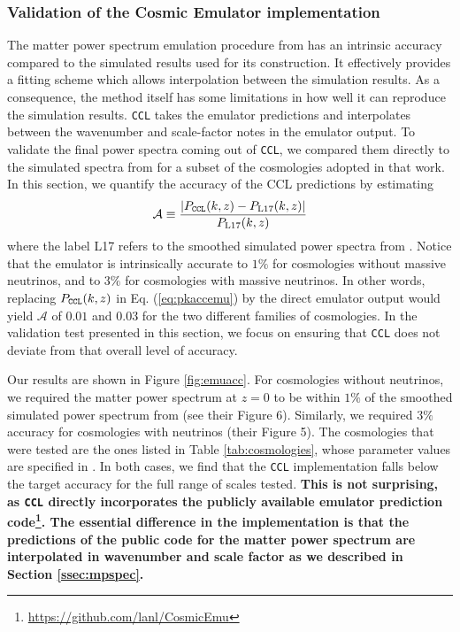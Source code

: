 \documentclass[\docopts]{\docclass}
\newcommand{\ccl}{{\tt CCL}\xspace}
\begin{document}
\subsubsection{Validation of the Cosmic Emulator implementation}
\label{ss:cosmicemu}

The matter power spectrum emulation procedure from \citet{Lawrence17} has an intrinsic accuracy compared to the simulated results used for its construction. It effectively provides a fitting scheme which allows interpolation between the simulation results. As a consequence, the method itself has some limitations in how well it can reproduce the simulation results. \ccl takes the emulator predictions and interpolates between the wavenumber and scale-factor notes in the emulator output. To validate the final power spectra coming out of \ccl, we compared them directly to the simulated spectra from \citet{Lawrence17} for a subset of the cosmologies adopted in that work. In this section, we quantify the accuracy of the CCL predictions by estimating
\begin{equation}
  \mathcal{A}\equiv\frac{|P_{\tt CCL}(k,z)-P_{\rm L17}(k,z)|}{P_{\rm L17}(k,z)}
  \label{eq:pkaccemu}
\end{equation}
where the label L17 refers to the smoothed simulated power spectra from \citet{Lawrence17}. Notice that the emulator is intrinsically accurate to $1\%$ for cosmologies without massive neutrinos, and to $3\%$ for cosmologies with massive neutrinos. In other words, replacing $P_{\tt CCL}(k,z)$ in Eq. (\ref{eq:pkaccemu}) by the direct emulator output would yield $\mathcal{A}$ of $0.01$ and $0.03$ for the two different families of cosmologies. In the validation test presented in this section, we focus on ensuring that \ccl does not deviate from that overall level of accuracy.

Our results are shown in Figure \ref{fig:emuacc}. For cosmologies without neutrinos, we required the matter power spectrum at $z=0$ to be within $1\%$ of the smoothed simulated power spectrum from \citet{Lawrence17} (see their Figure 6). Similarly, we required $3\%$ accuracy for cosmologies with neutrinos (their Figure 5). The cosmologies that were tested are the ones listed in Table \ref{tab:cosmologies}, whose parameter values are specified in \citet{Lawrence17}. In both cases, we find that the \ccl implementation falls below the target accuracy for the full range of scales tested. {\bf This is not surprising, as \ccl directly incorporates the publicly available emulator prediction code\footnote{\url{https://github.com/lanl/CosmicEmu}}. The essential difference in the implementation is that the predictions of the public code for the matter power spectrum are interpolated in wavenumber and scale factor as we described in Section \ref{ssec:mpspec}.}
\end{document}
